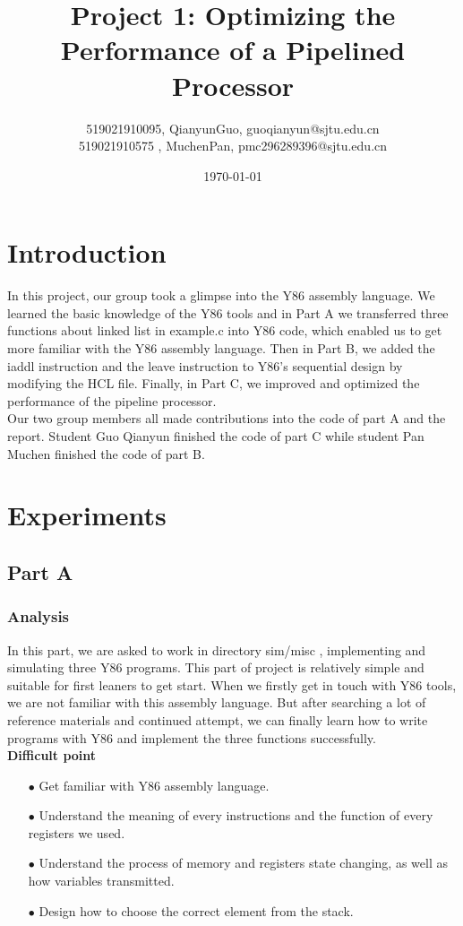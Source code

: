 \documentclass{article}
\title{\textbf{Project 1: Optimizing the Performance of a Pipelined Processor}} %
\author{519021910095, QianyunGuo, guoqianyun@sjtu.edu.cn \\
        519021910575 , MuchenPan, pmc296289396@sjtu.edu.cn } %
\date{\today} %
\begin{document}
\maketitle %

\section{Introduction}


In this project, our group took a glimpse into the Y86 assembly language. We learned the basic knowledge of the Y86 tools and in Part A we transferred three functions about linked list in {\ttfamily example.c} into Y86 code, which enabled us to get more familiar with the Y86 assembly language. Then in Part B, we added the iaddl instruction and the leave instruction to Y86’s sequential design by modifying the HCL file. Finally, in Part C, we improved and optimized the performance of the pipeline processor.\\
Our two group members all made contributions into the code of part A and the report. Student Guo Qianyun finished the code of part C while student Pan Muchen finished the code of part B.


\section{Experiments}
\subsection{Part A}

\subsubsection{Analysis}

In this part, we are asked to work in directory {\ttfamily sim/misc} , implementing and simulating three Y86 programs. This part of project is relatively simple and suitable for first leaners to get start. When we firstly get in touch with Y86 tools, we are not familiar with this assembly language. But after searching a lot of reference materials and continued attempt, we can finally learn how to write programs with Y86 and implement the three functions successfully.\\

{\normalsize\bfseries Difficult point}
\begin{itemize}
\item[$\bullet$]Get familiar with Y86 assembly language.
\item[$\bullet$]Understand the meaning of every instructions and the function of every registers we used. 
\item[$\bullet$]Understand the process of memory and registers state changing, as well as how variables transmitted.
\item[$\bullet$]Design how to choose the correct element from the stack.
\end{itemize}
\end{document}
